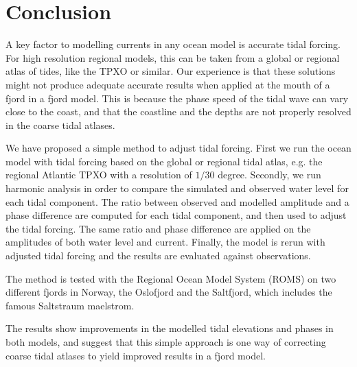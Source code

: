 \section{Conclusion}

A key factor to modelling currents in any ocean model is accurate tidal forcing. For high resolution regional models, this can be taken from a global or regional atlas of tides, like the TPXO or similar. Our experience is that these solutions might not produce adequate accurate results when applied at the mouth of a fjord in a fjord model. This is because the phase speed of the tidal wave can vary close to the coast, and that the coastline and the depths are not properly resolved in the coarse tidal atlases.

We have proposed a simple method to adjust tidal forcing. First we run the ocean model with tidal forcing based on the global or regional tidal atlas, e.g. the regional Atlantic TPXO with a resolution of $1/30$ degree. Secondly, we run harmonic analysis in order to compare the simulated and observed water level for each tidal component. The ratio between observed and modelled amplitude and a phase difference are computed for each tidal component, and then used to adjust the tidal forcing. The same ratio and phase difference are applied on the amplitudes of both water level and current. Finally, the model is rerun with adjusted tidal forcing and the results are evaluated against observations.

The method is tested with the Regional Ocean Model System (ROMS) on two different fjords in Norway, the Oslofjord and the Saltfjord, which includes the famous Saltstraum maelstrom.
 
The results show improvements in the modelled tidal elevations and phases in both models, and suggest that this simple approach is one way of correcting coarse tidal atlases to yield improved results in a fjord model.
